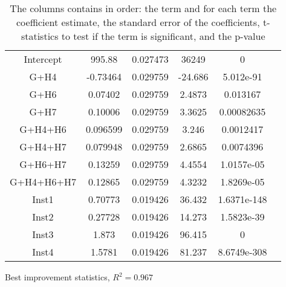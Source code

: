 \documentclass[../main.tex]{subfiles}
\begin{document}
\begin{table}
\begin{adjustbox}{width=\columnwidth,center}
\begin{subtable}{.75\columnwidth}
\begin{tabular}{cccccc}
            \hline                
        Intercept       & 995.88    & 0.027473      & 36249     & 0         \\
            G+H4        & -0.73464  & 0.029759      & -24.686   & 5.012e-91 \\
            G+H6        & 0.07402   & 0.029759      & 2.4873    & 0.013167  \\
            G+H7        & 0.10006   & 0.029759      & 3.3625    & 0.00082635\\
            G+H4+H6     & 0.096599  & 0.029759      & 3.246     & 0.0012417 \\
            G+H4+H7     & 0.079948  & 0.029759      & 2.6865    & 0.0074396 \\
            G+H6+H7     & 0.13259   & 0.029759      & 4.4554    & 1.0157e-05\\
            G+H4+H6+H7  & 0.12865   & 0.029759      & 4.3232    & 1.8269e-05\\
            Inst1       & 0.70773   & 0.019426      & 36.432    &1.6371e-148\\
            Inst2       & 0.27728   & 0.019426      & 14.273    & 1.5823e-39\\
            Inst3       & 1.873     & 0.019426      & 96.415    & 0         \\
            Inst4       & 1.5781    & 0.019426      & 81.237    &8.6749e-308\\
            \hline
            \end{tabular}
        \caption{Best improvement statistics, $R^2=0.967$}
        \label{tab:regrBestGroup}
        \end{subtable}
    \end{adjustbox}
    \label{tab:regrGroup}
    \caption*{The columns contains in order: the term and for each term the coefficient estimate, the standard error of the coefficients, t-statistics to test if the term is significant, and the p-value}
\end{table}
\end{document}
